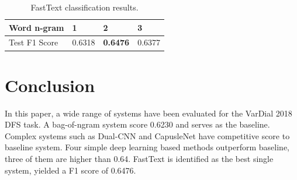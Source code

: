 \documentclass[11pt]{article}
\begin{document}
\begin{table}[h]
	\centering
	
	
	\begin{tabular}{|l|l|l|l|}
		\hline
		Word n-gram   & 1      & 2               & 3      \\ \hline
		Test F1 Score & 0.6318 & \textbf{0.6476} & 0.6377 \\ \hline
	\end{tabular}
	\caption{FastText classification results.}
	\label{fasttextClassification}
\end{table}




















 

\section{Conclusion}
In this paper, a wide range of systems have been evaluated for the VarDial 2018 DFS task. A bag-of-ngram system score 0.6230 and serves as the baseline. Complex systems such as Dual-CNN and CapusleNet have competitive score to baseline system. Four simple deep learning based methods outperform baseline, three of them are higher than 0.64. FastText is identified as the best single system, yielded a F1 score of 0.6476.




%






\end{document}
